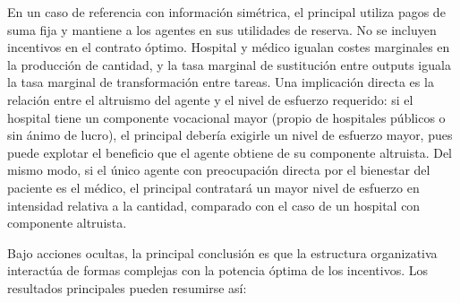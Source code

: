 \documentclass[12pt, a4paper, twoside, openright]{book}
\theoremstyle{plain}
\theoremstyle{definition}
\theoremstyle{remark}
\begin{document}
En un caso de referencia con información simétrica, el principal utiliza pagos de suma fija y mantiene a los agentes en sus utilidades de reserva. No se incluyen incentivos en el contrato óptimo. Hospital y médico igualan costes marginales en la producción de cantidad, y la tasa marginal de sustitución entre outputs iguala la tasa marginal de transformación entre tareas. Una implicación directa es la relación entre el altruismo del agente y el nivel de esfuerzo requerido: si el hospital tiene un componente vocacional mayor (propio de hospitales públicos o sin ánimo de lucro), el principal debería exigirle un nivel de esfuerzo mayor, pues puede explotar el beneficio que el agente obtiene de su componente altruista. Del mismo modo, si el único agente con preocupación directa por el bienestar del paciente es el médico, el principal contratará un mayor nivel de esfuerzo en intensidad relativa a la cantidad, comparado con el caso de un hospital con componente altruista.

Bajo acciones ocultas, la principal conclusión es que la estructura organizativa interactúa de formas complejas con la potencia óptima de los incentivos. Los resultados principales pueden resumirse así:
\end{document}

